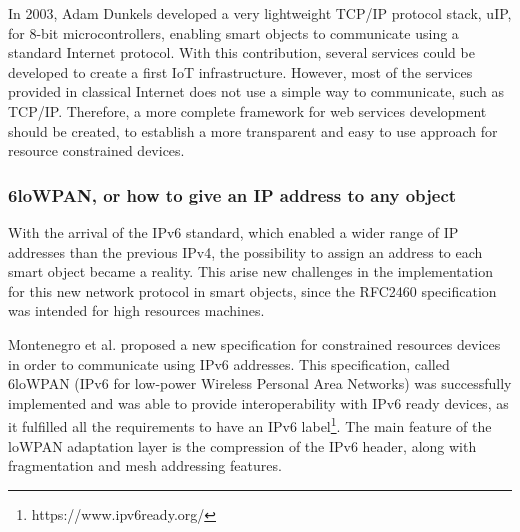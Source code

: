 In 2003, Adam Dunkels developed a very lightweight TCP/IP protocol stack, uIP\cite{dunkels03full}, for 8-bit microcontrollers, enabling smart objects to communicate using a standard Internet protocol.
With this contribution, several services could be developed to create a first IoT infrastructure.
However, most of the services provided in classical Internet does not use a simple way to communicate, such as TCP/IP.
Therefore, a more complete framework for web services development should be created, to establish a more transparent and easy to use approach for resource constrained devices.

\subsubsection{6loWPAN, or how to give an IP address to any object}
With the arrival of the IPv6 standard\cite{rfc2460}, which enabled a wider range of IP addresses than the previous IPv4, the possibility to assign an address to each smart object became a reality.
This arise new challenges in the implementation for this new network protocol in smart objects, since the RFC2460 specification was intended for high resources machines.

Montenegro et al. proposed a new specification\cite{rfc4944} for constrained resources devices in order to communicate using IPv6 addresses.
This specification, called 6loWPAN (IPv6 for low-power Wireless Personal Area Networks) was successfully implemented\cite{durvy08making} and was able to provide interoperability with IPv6 ready devices, as it fulfilled all the requirements to have an IPv6 label\footnote{https://www.ipv6ready.org/}.
The main feature of the loWPAN adaptation layer is the compression of the IPv6 header, along with fragmentation and mesh addressing features.




